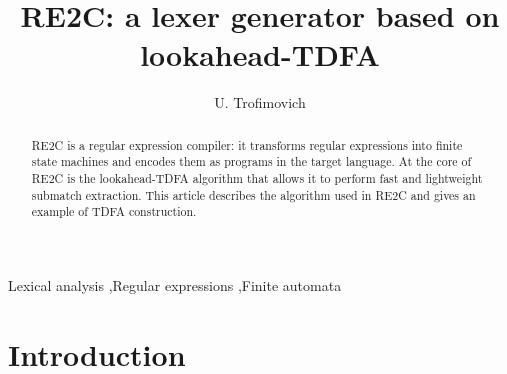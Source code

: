 \documentclass[preprint,12pt, a4paper]{elsarticle}
\begin{document}
\begin{frontmatter}



\title{RE2C: a lexer generator based on lookahead-TDFA}


\author{U. Trofimovich}

\begin{abstract}
RE2C is a regular expression compiler:
it transforms regular expressions into finite state machines
and encodes them as programs in the target language.
At the core of RE2C is the lookahead-TDFA algorithm
that allows it to perform fast and lightweight submatch extraction.
This article describes the algorithm used in RE2C and gives an example of TDFA construction.
\end{abstract}

\begin{keyword}
Lexical analysis \sep Regular expressions \sep Finite automata



\end{keyword}

\end{frontmatter}

\section{Introduction}
\end{document}
